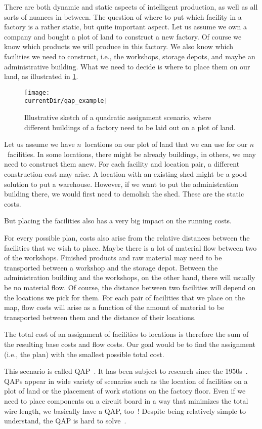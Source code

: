 %
%
There are both dynamic and static aspects of intelligent production, as well as all sorts of nuances in between.
The question of where to put which facility in a factory is a rather static, but quite important aspect.
Let us assume we own a company and bought a plot of land to construct a new factory.
Of course we know which products we will produce in this factory.
We also know which facilities we need to construct, i.e., the workshops, storage depots, and maybe an administrative building.
What we need to decide is where to place them on our land, as illustrated in \cref{fig:qap_example}.%
%
\begin{figure}%
\centering%
\texttt{[image: \\currentDir/qap\_example]}%
\caption{Illustrative sketch of a quadratic assignment scenario, where different buildings of a factory need to be laid out on a plot of land.}%
\label{fig:qap_example}%
\end{figure}%

Let us assume we have $n$~locations on our plot of land that we can use for our $n$~facilities.
In some locations, there might be already buildings, in others, we may need to construct them anew.
For each facility and location pair, a different construction cost may arise.
A location with an existing shed might be a good solution to put a warehouse.
However, if we want to put the administration building there, we would first need to demolish the shed.
These are the static costs.

But placing the facilities also has a very big impact on the running costs.

For every possible plan, costs also arise from the relative distances between the facilities that we wish to place.
Maybe there is a lot of material flow between two of the workshops.
Finished products and raw material may need to be transported between a workshop and the storage depot.
Between the administration building and the workshops, on the other hand, there will usually be no material flow.
Of course, the distance between two facilities will depend on the locations we pick for them.
For each pair of facilities that we place on the map, flow costs will arise as a function of the amount of material to be transported between them and the distance of their locations.

The total cost of an assignment of facilities to locations is therefore the sum of the resulting base costs and flow costs.
Our goal would be to find the assignment (i.e., the plan) with the smallest possible total cost.

This scenario is called \acrfull{QAP}~\cite{BCPP1998TQAP}.
It has been subject to research since the 1950s~\cite{BK1957APATLOEA}.
\glspl{QAP} appear in wide variety of scenarios such as the location of facilities on a plot of land or the placement of work stations on the factory floor.
Even if we need to place components on a circuit board in a way that minimizes the total wire length, we basically have a \gls{QAP}, too~\cite{S1961TBWPAPA}!
Despite being relatively simple to understand, the \gls{QAP} is hard to solve~\cite{SGA1976PCAP}.
%
\endhsection%
%

